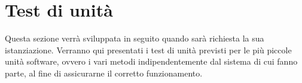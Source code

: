 \documentclass[PianoDiQualifica.tex]{subfiles}
\begin{document}
\chapter{Test di unità}
Questa sezione verrà sviluppata in seguito quando sarà richiesta la sua istanziazione.
Verranno qui presentati i test di unità previsti per le più piccole unità software, ovvero i vari metodi indipendentemente dal sistema di cui fanno parte, al fine di assicurarne il corretto funzionamento.
\end{document}
